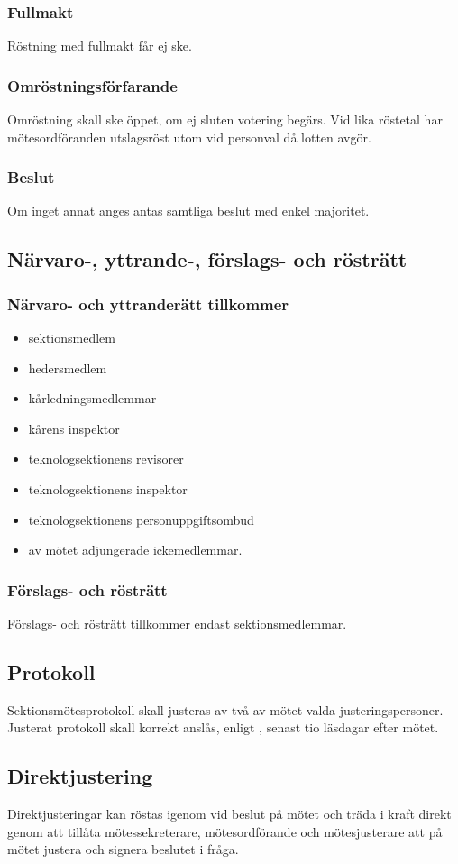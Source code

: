 \subsubsection{Fullmakt}
Röstning med fullmakt får ej ske.

\subsubsection{Omröstningsförfarande}
Omröstning skall ske öppet, om ej sluten votering begärs. Vid lika röstetal har mötesordföranden utslagsröst utom vid personval då lotten avgör.

\subsubsection{Beslut}
Om inget annat anges antas samtliga beslut med enkel majoritet.

\subsection{Närvaro-, yttrande-, förslags- och rösträtt}

\subsubsection{Närvaro- och yttranderätt tillkommer}
\begin{itemize}
	\item sektionsmedlem
	\item hedersmedlem
	\item kårledningsmedlemmar
	\item kårens inspektor
	\item teknologsektionens revisorer
	\item teknologsektionens inspektor
	\item teknologsektionens personuppgiftsombud
	\item av mötet adjungerade ickemedlemmar.
\end{itemize}

\subsubsection{Förslags- och rösträtt}
Förslags- och rösträtt tillkommer endast sektionsmedlemmar.

\subsection{Protokoll}
Sektionsmötesprotokoll skall justeras av två av mötet valda justeringspersoner. Justerat protokoll skall korrekt anslås, enligt , senast tio läsdagar efter mötet.

\subsection{Direktjustering}
Direktjusteringar kan röstas igenom vid beslut på mötet och träda i kraft direkt genom att tillåta mötessekreterare, mötesordförande och mötesjusterare att på mötet justera och signera beslutet i fråga.